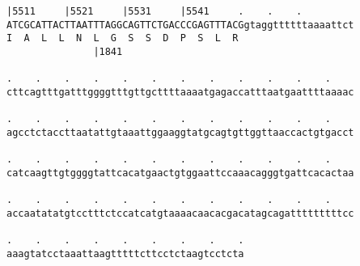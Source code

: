 \documentclass{article}
\begin{document}
\begin{Verbatim}[fontfamily=courier]
     |5511     |5521     |5531     |5541     .    .    .    
ATCGCATTACTTAATTTAGGCAGTTCTGACCCGAGTTTACGgtaggttttttaaaattct
I  A  L  L  N  L  G  S  S  D  P  S  L  R                    
               |1841                                        

.    .    .    .    .    .    .    .    .    .    .    .    
cttcagtttgatttggggtttgttgcttttaaaatgagaccatttaatgaattttaaaac

.    .    .    .    .    .    .    .    .    .    .    .    
agcctctaccttaatattgtaaattggaaggtatgcagtgttggttaaccactgtgacct

.    .    .    .    .    .    .    .    .    .    .    .    
catcaagttgtggggtattcacatgaactgtggaattccaaacagggtgattcacactaa

.    .    .    .    .    .    .    .    .    .    .    .    
accaatatatgtcctttctccatcatgtaaaacaacacgacatagcagatttttttttcc

.    .    .    .    .    .    .    .    .
aaagtatcctaaattaagtttttcttcctctaagtcctcta
\end{Verbatim}
\newpage
\end{document}
